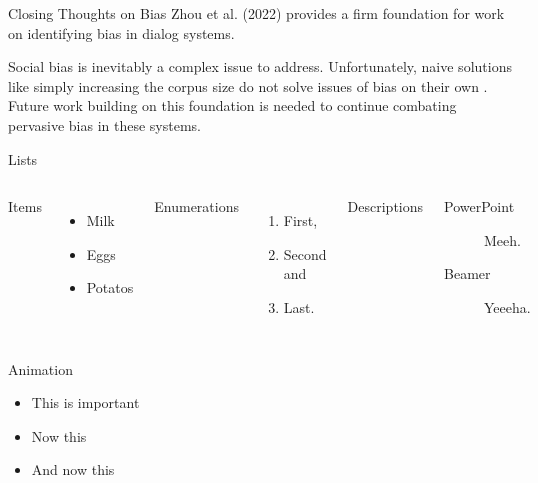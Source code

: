 \documentclass[10pt]{beamer}
\begin{document}
\begin{frame}{Closing Thoughts on Bias}
Zhou et al. (2022) \cite{bias} provides a firm foundation for work on identifying bias in dialog systems. 

Social bias is inevitably a complex issue to address. Unfortunately, naive solutions like simply increasing the corpus size do not solve issues of bias on their own \cite{bias2}. Future work building on this foundation is needed to continue combating pervasive bias in these systems.
\end{frame}

\begin{frame}{Lists}
  \begin{columns}[T,onlytextwidth]
      Items
      \begin{itemize}
        \item Milk \item Eggs \item Potatos
      \end{itemize}

      Enumerations
      \begin{enumerate}
        \item First, \item Second and \item Last.
      \end{enumerate}

      Descriptions
      \begin{description}
        \item[PowerPoint] Meeh. \item[Beamer] Yeeeha.
      \end{description}
  \end{columns}
\end{frame}
\begin{frame}{Animation}
  \begin{itemize}[<+- | alert@+>]
    \item \alert<4>{This is important}
    \item Now this
    \item And now this
  \end{itemize}
\end{frame}
\end{document}
